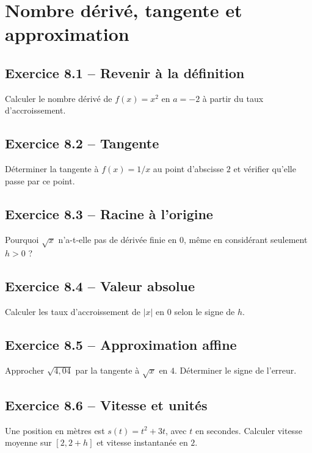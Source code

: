 \chapter{Nombre dérivé, tangente et approximation}
\section*{Exercice 8.1 -- Revenir à la définition}
Calculer le nombre dérivé de $f(x)=x^2$ en $a=-2$ à partir du taux d'accroissement.

\section*{Exercice 8.2 -- Tangente}
Déterminer la tangente à $f(x)=1/x$ au point d'abscisse $2$ et vérifier qu'elle passe par ce point.

\section*{Exercice 8.3 -- Racine à l'origine}
Pourquoi $\sqrt x$ n'a-t-elle pas de dérivée finie en $0$, même en considérant seulement $h>0$ ?

\section*{Exercice 8.4 -- Valeur absolue}
Calculer les taux d'accroissement de $|x|$ en $0$ selon le signe de $h$.

\section*{Exercice 8.5 -- Approximation affine}
Approcher $\sqrt{4{,}04}$ par la tangente à $\sqrt x$ en $4$. Déterminer le signe de l'erreur.

\section*{Exercice 8.6 -- Vitesse et unités}
Une position en mètres est $s(t)=t^2+3t$, avec $t$ en secondes. Calculer vitesse moyenne sur $[2,2+h]$ et vitesse instantanée en $2$.
